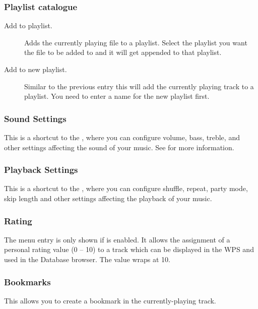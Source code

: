 \subsubsection{Playlist catalogue}
  \begin{description}
    \item [Add to playlist.] Adds the currently playing file to a playlist.
    Select the playlist you want the file to be added to and it will get
    appended to that playlist.
    \item [Add to new playlist.] Similar to the previous entry this will
    add the currently playing track to a playlist. You need to enter a name
    for the new playlist first.
  \end{description}

\subsubsection{Sound Settings}
This is a shortcut to the , where you can configure volume,
bass, treble, and other settings affecting the sound of your music.
See  for more information.

\subsubsection{Playback Settings}
This is a shortcut to the , where you can configure shuffle,
repeat, party mode, skip length and other settings affecting the playback of your music.

\subsubsection{Rating}
The menu entry is only shown if  is
enabled. It allows the assignment of a personal rating value (0 -- 10)
to a track which can be displayed in the WPS and used in the Database
browser. The value wraps at 10.

\subsubsection{Bookmarks}
This allows you to create a bookmark in the currently-playing track.

